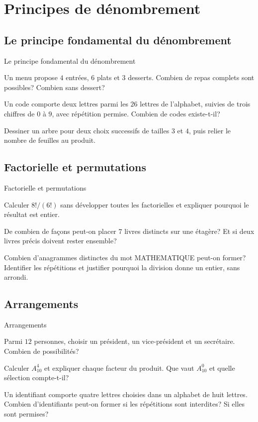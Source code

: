 \chapter{Principes de dénombrement}
\label{workbook:chapter:07}
\section{Le principe fondamental du dénombrement}
\label{workbook:section:07.01}
\begin{exerciseblock}{Le principe fondamental du dénombrement}
\item Un menu propose $4$ entrées, $6$ plats et $3$ desserts. Combien de repas complets sont possibles? Combien sans dessert?
\item Un code comporte deux lettres parmi les $26$ lettres de l'alphabet, suivies de trois chiffres de $0$ à $9$, avec répétition permise. Combien de codes existe-t-il?
\item Dessiner un arbre pour deux choix successifs de tailles $3$ et $4$, puis relier le nombre de feuilles au produit.
\end{exerciseblock}
\section{Factorielle et permutations}
\label{workbook:section:07.02}
\begin{exerciseblock}{Factorielle et permutations}
\item Calculer $8!/(6!)$ sans développer toutes les factorielles et expliquer pourquoi le résultat est entier.
\item De combien de façons peut-on placer $7$ livres distincts sur une étagère? Et si deux livres précis doivent rester ensemble?
\item Combien d'anagrammes distinctes du mot MATHEMATIQUE peut-on former? Identifier les répétitions et justifier pourquoi la division donne un entier, sans arrondi.
\end{exerciseblock}
\section{Arrangements}
\label{workbook:section:07.03}
\begin{exerciseblock}{Arrangements}
\item Parmi $12$ personnes, choisir un président, un vice-président et un secrétaire. Combien de possibilités?
\item Calculer $A_{10}^4$ et expliquer chaque facteur du produit. Que vaut $A_{10}^0$ et quelle sélection compte-t-il?
\item Un identifiant comporte quatre lettres choisies dans un alphabet de huit lettres. Combien d'identifiants peut-on former si les répétitions sont interdites? Si elles sont permises?
\end{exerciseblock}
